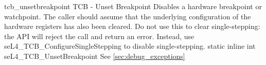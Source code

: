 %
%
%
%

\apidoc
{tcb_unsetbreakpoint}
{TCB - Unset Breakpoint}
{Disables a hardware breakpoint or watchpoint. The caller should assume that
the underlying configuration of the hardware registers has also been cleared.
Do not use this to clear single-stepping: the API will reject the call and
return an error. Instead, use seL4\_TCB\_ConfigureSingleStepping to disable
single-stepping.}
{static inline int seL4\_TCB\_UnsetBreakpoint}
{
}
{\errorenumdesc}
{See \autoref{sec:debug_exceptions}}
